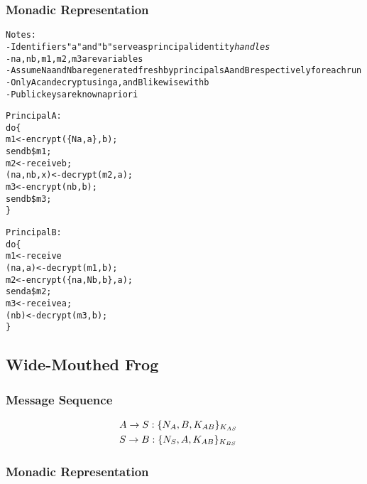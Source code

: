 \documentclass[10pt]{article}
\begin{document}
\subsubsection*{Monadic Representation}

\begin{alltt}
  Notes:  
  -Identifiers "a" and "b" serve as principal identity \emph{handles}
  -na, nb, m1, m2, m3 are variables
  -Assume Na and Nb are generated fresh by principals A and B respectively for each run
  -Only A can decrypt using a, and B likewise with b
  -Public keys are known a priori
 
  
  Principal A:
  do \{                
       m1 <- encrypt(\{Na, a\}, b);     % encrypt a's nonce and its i.d. with b's public key
       send b \$ m1;    			              % send result to b
       m2 <- receive b;               % receive (encrypted) message from b
       (na, nb, x) <- decrypt(m2, a); % decrypt m2 using private key of a
       m3 <- encrypt(nb, b);          % encrypt b's nonce with b's public key
       send b \$ m3;                   % send result to b
  \}
\end{alltt}

\begin{alltt}
  Principal B:
  do \{                
       m1 <- receive                  % receive initial (encrypted) message
       (na, a) <- decrypt(m1, b);     % decrypt m1 using b's private key
       m2 <- encrypt(\{na, Nb, b\}, a); % build m2 using na and a
       send a \$ m2;    			              % send result to a
       m3 <- receive a;               % receive (encrypted) message from b
       (nb) <- decrypt(m3, b);        % decrypt it
  \}
\end{alltt}

\subsection*{Wide-Mouthed Frog}
\subsubsection*{Message Sequence}
\begin{align*}
& A\rightarrow S:\{N_{A}, B, K_{AB}\}_{K_{AS}} \;& \\
& S\rightarrow B:\{N_{S}, A, K_{AB}\}_{K_{BS}} \;& \\
\end{align*}
\subsubsection*{Monadic Representation}
\end{document}
